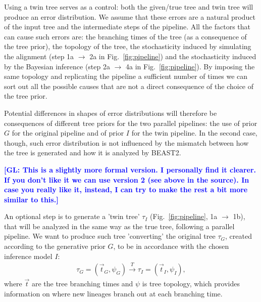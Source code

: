 \documentclass{article}
\newcommand{\giovanni}[1]{\textcolor{blue}{\textbf{[GL: #1]}}}
\begin{document}
Using a twin tree serves as a control: both the given/true tree and twin tree will produce an error distribution. We assume that these errors are a natural product of the input tree and the intermediate steps of the pipeline. All the factors that can cause such errors are: the branching times of the tree (as a consequence of the tree prior), the topology of the tree, the stochasticity induced by simulating the alignment (step 1a $\rightarrow$ 2a in Fig.~\ref{fig:pipeline}) and the stochasticity induced by the Bayesian inference (step 2a $\rightarrow$ 4a in Fig.~\ref{fig:pipeline}). By imposing the same topology and replicating the pipeline a sufficient number of times we can sort out all the possible causes that are not a direct consequence of the choice of the tree prior.

Potential differences in shapes of error distributions will therefore be consequences of different tree priors for the two parallel pipelines: the use of prior $\mathit{G}$ for the original pipeline and of prior $\mathit{I}$ for the twin pipeline. In the second case, though, such error distribution is not influenced by the mismatch between how the tree is generated and how it is analyzed by BEAST2.
\fi

\giovanni{This is a slightly more formal version. I personally find it clearer. If you don't like it we can use version 2 (see above in the source). In case you really like it, instead, I can try to make the rest a bit more similar to this.}

An optional step is to generate a 'twin tree' $\tau_{I}$
(Fig.~\ref{fig:pipeline}, 1a $\rightarrow$ 1b),
that will be analyzed in the same way as the true tree, following a parallel pipeline. We want to produce such tree 'converting' the original tree $\tau_{G}$, created according to the generative prior $\mathit{G}$, to be in accordance with the chosen inference model $\mathit{I}$:
\begin{align}
    \tau_{G} = (\Vec{t}_{G}, \psi_{G}) \xrightarrow[]{\mathit{T}} \tau_{I} = (\Vec{t}_{I}, \psi_{I}),
\end{align}
where $\Vec{t}$ are the tree branching times and $\psi$ is tree topology, which provides information on where new lineages branch out at each branching time.
\end{document}
